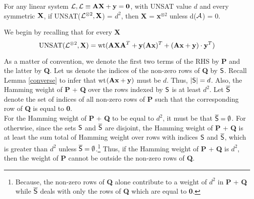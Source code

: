 {\begin{lemma}\label{decode}
  For any linear system ${\cal L}, {\cal L} \equiv {\bf AX} + {\bf y} = {\bf
    0}$, with UNSAT value $d$ and every symmetric ${\bf X}$, if
  UNSAT(${\cal L}^{\otimes 2}, {\bf X}$) = $d^2$, then {\bf X} = {\bf
    x}$^{\otimes 2}$ unless d(${\cal A}$) = 0.%
\end{lemma}
 We begin by recalling that for every {\bf X}
\[
\mbox{UNSAT}({\cal L}^{\otimes 2}, {\bf X}) = \mbox{wt}({\bf AXA}^T + {\bf
  y}({\bf Ax})^T + \left({\bf Ax} + {\bf y} \right)\cdot {\bf y}^T)
\]

\noindent As a matter of convention, we denote the first two terms of the RHS 
by {\bf P} and the latter by {\bf Q}. Let us 
denote the indices of the non-zero rows of {\bf Q} by ${\sf S}$. Recall Lemma 
\ref{converse} to infer that wt$({\bf Ax} + {\bf y})$ must be $d$. 
Thus, $|{\sf S}| = d$. Also, the Hamming weight of {\bf P} + {\bf Q} over the
rows indexed by ${\sf S}$ is at least $d^2$. Let ${\overline{{\sf S}}}$ denote 
the set of indices of all non-zero rows of {\bf P} such that the 
corresponding row of {\bf Q} is equal to {\bf 0}. \\


\noindent For the Hamming weight of {\bf P} + {\bf Q} to be 
equal to $d^2$, it must be that $\overline{{\sf S}} = \emptyset$. For 
otherwise, since the sets ${\sf S}$ and $\overline{{\sf S}}$  are disjoint, the 
Hamming weight of {\bf P} + {\bf Q} is at least the sum total of Hamming
weight over rows with indices ${\sf S}$ and $\overline{{\sf S}}$, which is greater 
than $d^2$ unless $\overline{{\sf S}} = \emptyset$.\footnote{Because, the non-zero rows of 
{\bf Q} alone contribute to a weight of $d^2$ in {\bf P} + {\bf Q} while $\overline{{\sf S}}$ deals with 
only the rows of {\bf Q} which are equal to {\bf 0}.} Thus, if the 
Hamming weight of {\bf  P} + {\bf Q} is $d^2$, then the 
weight of {\bf P} cannot be outside the non-zero rows of {\bf Q}.\\

}

